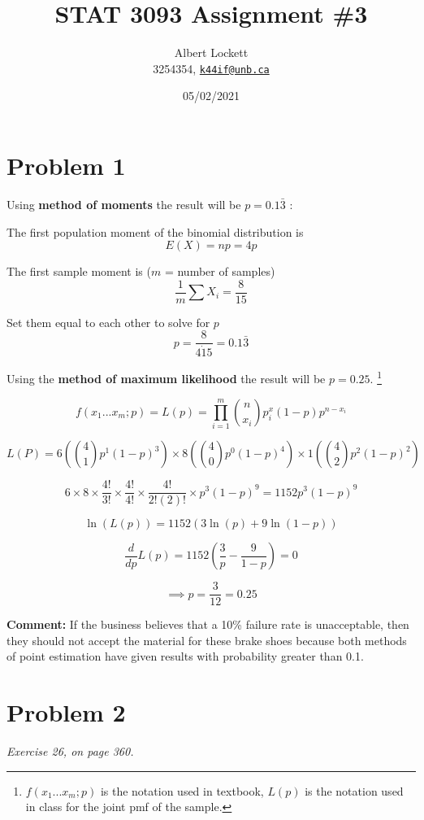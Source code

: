 \documentclass[a4paper,11pt]{article}
\begin{document}
\title{STAT 3093 Assignment \#3}
\author{
  Albert Lockett \\ 
  3254354, 
  \href{mailto:k44if@unb.ca}{\texttt{k44if@unb.ca}}
  }
\date{05/02/2021}

\section*{Problem 1}

Using \textbf{method of moments} the result will be $p = 0.1\bar{3}$ : \newline

The first population moment of the binomial distribution is
\[ E(X) = np = 4p \]

The first sample moment is ($m$ = number of samples)
\[ \frac{1}{m} \sum{X_i} = \frac{8}{15}\]

Set them equal to each other to solve for $p$
\[ p = \frac{8}{4 \dot 15} = 0.1\bar{3} \]
\vspace{1cm}

Using the \textbf{method of maximum likelihood} the result will be $p=0.25$.
\footnote{$f(x_1...x_m;p)$ is the notation used in textbook, $L(p)$ is the notation used in class for the joint pmf of the sample.}

\[ f(x_1...x_m;p) = L(p) = \prod^m_{i = 1}{\binom{n}{x_i}p^x_i(1-p)p^{n-x_i}} \]

\[ L(P) = 6 \left(\binom{4}{1}p^1(1-p)^3\right) \times 8 \left(\binom{4}{0}p^0(1-p)^4\right) \times 1 \left(\binom{4}{2}p^2(1-p)^2\right) \]

\[ 6 \times 8 \times \frac{4!}{3!} \times \frac{4!}{4!} \times \frac{4!}{2!(2)!} \times p^{3} (1-p)^9 = 1152 p^{3} (1-p)^9 \]

\[ \ln(L(p)) = 1152 \left( 3\ln(p) + 9\ln(1-p) \right) \]

\[ \frac{d}{dp}L(p) = 1152 \left( \frac{3}{p} - \frac{9}{1-p} \right) = 0 \]

\[ \implies p = \frac{3}{12} = 0.25 \]

\vspace{1cm}
\textbf{Comment:}\newline
If the business believes that a 10\% failure rate is unacceptable, then they should not accept the material for
these brake shoes because both methods of point estimation have given results with probability greater than 0.1.

\clearpage

\section*{Problem 2}
\textit{Exercise 26, on page 360.}
\end{document}
